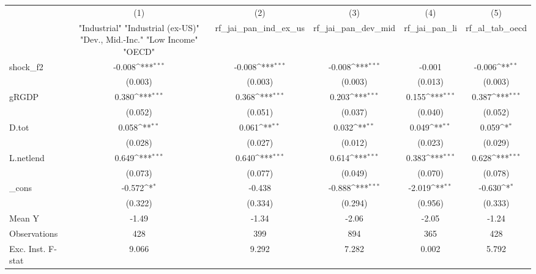 {
\def\sym#1{\ifmmode^{#1}\else\(^{#1}\)\fi}
\begin{tabular}{l*{5}{c}}
\toprule
            &\multicolumn{1}{c}{(1)}&\multicolumn{1}{c}{(2)}&\multicolumn{1}{c}{(3)}&\multicolumn{1}{c}{(4)}&\multicolumn{1}{c}{(5)}\\
            &\multicolumn{1}{c}{ "Industrial" "Industrial (ex-US)" "Dev., Mid.-Inc." "Low Income" "OECD" }&\multicolumn{1}{c}{rf\_jai\_pan\_ind\_ex\_us}&\multicolumn{1}{c}{rf\_jai\_pan\_dev\_mid}&\multicolumn{1}{c}{rf\_jai\_pan\_li}&\multicolumn{1}{c}{rf\_al\_tab\_oecd}\\
\midrule
shock\_f2    &      -0.008\sym{***}&      -0.008\sym{***}&      -0.008\sym{***}&      -0.001         &      -0.006\sym{**} \\
            &     (0.003)         &     (0.003)         &     (0.003)         &     (0.013)         &     (0.003)         \\
\addlinespace
gRGDP       &       0.380\sym{***}&       0.368\sym{***}&       0.203\sym{***}&       0.155\sym{***}&       0.387\sym{***}\\
            &     (0.052)         &     (0.051)         &     (0.037)         &     (0.040)         &     (0.052)         \\
\addlinespace
D.tot       &       0.058\sym{**} &       0.061\sym{**} &       0.032\sym{**} &       0.049\sym{**} &       0.059\sym{*}  \\
            &     (0.028)         &     (0.027)         &     (0.012)         &     (0.023)         &     (0.029)         \\
\addlinespace
L.netlend   &       0.649\sym{***}&       0.640\sym{***}&       0.614\sym{***}&       0.383\sym{***}&       0.628\sym{***}\\
            &     (0.073)         &     (0.077)         &     (0.049)         &     (0.070)         &     (0.078)         \\
\addlinespace
\_cons      &      -0.572\sym{*}  &      -0.438         &      -0.888\sym{***}&      -2.019\sym{**} &      -0.630\sym{*}  \\
            &     (0.322)         &     (0.334)         &     (0.294)         &     (0.956)         &     (0.333)         \\
\midrule
Mean Y      &       -1.49         &       -1.34         &       -2.06         &       -2.05         &       -1.24         \\
Observations&         428         &         399         &         894         &         365         &         428         \\
Exc. Inst. F-stat&       9.066         &       9.292         &       7.282         &       0.002         &       5.792         \\
\bottomrule
\end{tabular}
}
